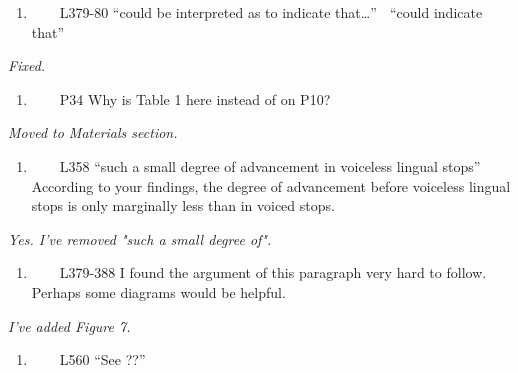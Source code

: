 \documentclass[]{article}
\providecommand{\tightlist}{%
  \setlength{\itemsep}{0pt}\setlength{\parskip}{0pt}}
\begin{document}
\begin{enumerate}
\def\labelenumi{\arabic{enumi}.}
\setcounter{enumi}{16}
\tightlist
\item
  ~~~~L379-80 ``could be interpreted as to indicate that\ldots{}'' 
  ``could indicate that''
\end{enumerate}

\begin{adjustwidth}{1cm}{} \textit{
Fixed.
} \end{adjustwidth}

\begin{enumerate}
\def\labelenumi{\arabic{enumi}.}
\setcounter{enumi}{17}
\tightlist
\item
  ~~~~P34 Why is Table 1 here instead of on P10?
\end{enumerate}

\begin{adjustwidth}{1cm}{} \textit{
Moved to Materials section.
} \end{adjustwidth}

\begin{enumerate}
\def\labelenumi{\arabic{enumi}.}
\setcounter{enumi}{18}
\tightlist
\item
  ~~~~L358 ``such a small degree of advancement in voiceless lingual
  stops'' According to your findings, the degree of advancement before
  voiceless lingual stops is only marginally less than in voiced stops.
\end{enumerate}

\begin{adjustwidth}{1cm}{} \textit{
Yes. I've removed "such a small degree of".
} \end{adjustwidth}

\begin{enumerate}
\def\labelenumi{\arabic{enumi}.}
\setcounter{enumi}{19}
\tightlist
\item
  ~~~~L379-388 I found the argument of this paragraph very hard to
  follow. Perhaps some diagrams would be helpful.
\end{enumerate}

\begin{adjustwidth}{1cm}{} \textit{
I've added Figure 7.
} \end{adjustwidth}

\begin{enumerate}
\def\labelenumi{\arabic{enumi}.}
\setcounter{enumi}{20}
\tightlist
\item
  ~~~~L560 ``See ??''
\end{enumerate}
\end{document}
